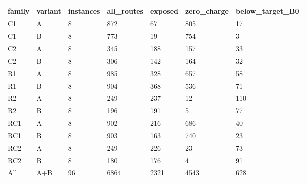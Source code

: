 \begin{tabular}{lllllll}
\hline
family & variant & instances & all\_routes & exposed & zero\_charge & below\_target\_B0 \\
\hline
C1 & A & 8 & 872 & 67 & 805 & 17 \\
C1 & B & 8 & 773 & 19 & 754 & 3 \\
C2 & A & 8 & 345 & 188 & 157 & 33 \\
C2 & B & 8 & 306 & 142 & 164 & 32 \\
R1 & A & 8 & 985 & 328 & 657 & 58 \\
R1 & B & 8 & 904 & 368 & 536 & 71 \\
R2 & A & 8 & 249 & 237 & 12 & 110 \\
R2 & B & 8 & 196 & 191 & 5 & 77 \\
RC1 & A & 8 & 902 & 216 & 686 & 40 \\
RC1 & B & 8 & 903 & 163 & 740 & 23 \\
RC2 & A & 8 & 249 & 226 & 23 & 73 \\
RC2 & B & 8 & 180 & 176 & 4 & 91 \\
All & A+B & 96 & 6864 & 2321 & 4543 & 628 \\
\hline
\end{tabular}
